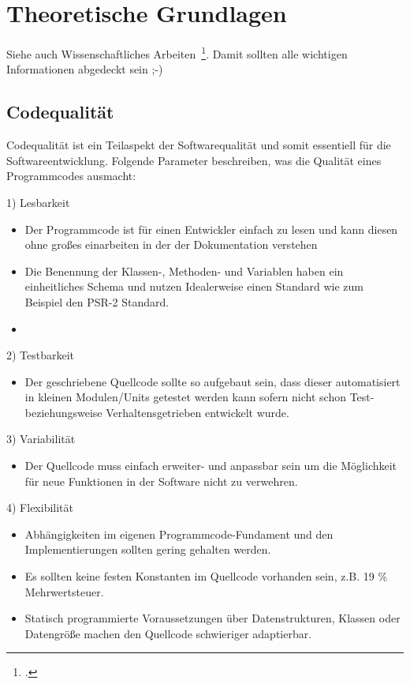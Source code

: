 \newpage
\section{Theoretische Grundlagen}
Siehe auch Wissenschaftliches Arbeiten~\footcite[Vgl. ][Seite 1]{Balzert.2008}. Damit sollten alle wichtigen Informationen abgedeckt sein ;-)

\subsection{Codequalität}
Codequalität ist ein Teilaspekt der Softwarequalität und somit essentiell für die Softwareentwicklung. Folgende Parameter beschreiben, was die Qualität eines Programmcodes ausmacht:

1) Lesbarkeit
\begin{itemize}
	\item Der Programmcode ist für einen Entwickler einfach zu lesen und kann diesen ohne großes einarbeiten in der der Dokumentation verstehen
	
	\item Die Benennung der Klassen-, Methoden- und Variablen haben ein einheitliches Schema und nutzen Idealerweise einen Standard wie zum Beispiel den PSR-2 Standard.
	
	\item 
		
\end{itemize}

2) Testbarkeit
\begin{itemize}	
	\item Der geschriebene Quellcode sollte so aufgebaut sein, dass dieser automatisiert in kleinen Modulen/Units getestet werden kann sofern nicht schon Test- beziehungsweise Verhaltensgetrieben entwickelt wurde.
	
\end{itemize}

3) Variabilität
\begin{itemize}	
	\item Der Quellcode muss einfach erweiter- und anpassbar sein um die Möglichkeit für neue Funktionen in der Software nicht zu verwehren.
	
\end{itemize}

4) Flexibilität
\begin{itemize}	
	\item Abhängigkeiten im eigenen Programmcode-Fundament und den Implementierungen sollten gering gehalten werden.
	
	\item Es sollten keine festen Konstanten im Quellcode vorhanden sein, z.B. 19 \% Mehrwertsteuer.
	
	\item Statisch programmierte Voraussetzungen über Datenstrukturen, Klassen oder Datengröße machen den Quellcode schwieriger adaptierbar.
	
\end{itemize}

